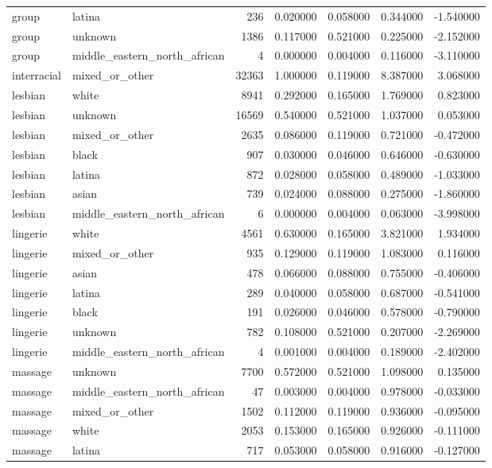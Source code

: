 \begin{tabular}{llrrrrr}
group & latina & 236 & 0.020000 & 0.058000 & 0.344000 & -1.540000 \\
group & unknown & 1386 & 0.117000 & 0.521000 & 0.225000 & -2.152000 \\
group & middle_eastern_north_african & 4 & 0.000000 & 0.004000 & 0.116000 & -3.110000 \\
interracial & mixed_or_other & 32363 & 1.000000 & 0.119000 & 8.387000 & 3.068000 \\
lesbian & white & 8941 & 0.292000 & 0.165000 & 1.769000 & 0.823000 \\
lesbian & unknown & 16569 & 0.540000 & 0.521000 & 1.037000 & 0.053000 \\
lesbian & mixed_or_other & 2635 & 0.086000 & 0.119000 & 0.721000 & -0.472000 \\
lesbian & black & 907 & 0.030000 & 0.046000 & 0.646000 & -0.630000 \\
lesbian & latina & 872 & 0.028000 & 0.058000 & 0.489000 & -1.033000 \\
lesbian & asian & 739 & 0.024000 & 0.088000 & 0.275000 & -1.860000 \\
lesbian & middle_eastern_north_african & 6 & 0.000000 & 0.004000 & 0.063000 & -3.998000 \\
lingerie & white & 4561 & 0.630000 & 0.165000 & 3.821000 & 1.934000 \\
lingerie & mixed_or_other & 935 & 0.129000 & 0.119000 & 1.083000 & 0.116000 \\
lingerie & asian & 478 & 0.066000 & 0.088000 & 0.755000 & -0.406000 \\
lingerie & latina & 289 & 0.040000 & 0.058000 & 0.687000 & -0.541000 \\
lingerie & black & 191 & 0.026000 & 0.046000 & 0.578000 & -0.790000 \\
lingerie & unknown & 782 & 0.108000 & 0.521000 & 0.207000 & -2.269000 \\
lingerie & middle_eastern_north_african & 4 & 0.001000 & 0.004000 & 0.189000 & -2.402000 \\
massage & unknown & 7700 & 0.572000 & 0.521000 & 1.098000 & 0.135000 \\
massage & middle_eastern_north_african & 47 & 0.003000 & 0.004000 & 0.978000 & -0.033000 \\
massage & mixed_or_other & 1502 & 0.112000 & 0.119000 & 0.936000 & -0.095000 \\
massage & white & 2053 & 0.153000 & 0.165000 & 0.926000 & -0.111000 \\
massage & latina & 717 & 0.053000 & 0.058000 & 0.916000 & -0.127000 \\

\end{tabular}
